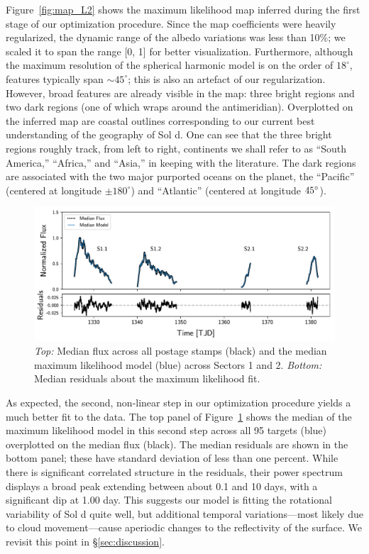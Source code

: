 \documentclass[modern]{aastex62}
\begin{document}
Figure~\ref{fig:map_L2} shows the maximum likelihood map inferred
during the first stage of our optimization procedure. Since the map
coefficients were heavily regularized, the dynamic range of the albedo
variations was less than 10\%; we scaled it to span the range [0, 1]
for better visualization. Furthermore, although the maximum resolution of
the spherical harmonic model is on 
the order of $18^\circ$, features typically span ${\sim}45^\circ$; this is
also an artefact of our regularization. However, broad features are already
visible in the map: three bright regions and two dark regions (one of which
wraps around the antimeridian). Overplotted on the inferred map are
coastal outlines corresponding to our current best understanding of 
the geography of Sol d. One can see that the three bright regions roughly
track, from left to right, continents we shall refer to as ``South America,''
``Africa,'' and ``Asia,'' in keeping with the literature. The dark regions
are associated with the two major purported oceans on the planet, the
``Pacific'' (centered at longitude $\pm180^\circ$) and ``Atlantic''
(centered at longitude $\-45^\circ$).

\begin{figure}[t!]
    \begin{centering}
    \includegraphics[width=\linewidth]{figures/model.pdf}
    \caption{\label{fig:model}
             \emph{Top:} Median flux across all postage stamps (black) and
             the median maximum likelihood model (blue) across Sectors 1 and 2.
             \emph{Bottom:} Median residuals about the maximum likelihood fit.
             }
    \end{centering}
\end{figure}

As expected, the second, non-linear step in our optimization procedure
yields a much better fit to the data.
The top panel of Figure~\ref{fig:model} shows the median of the 
maximum likelihood model in this second step
across all 95 targets (blue) overplotted on the median flux (black). 
The median residuals are shown in the bottom panel; these have
standard deviation of less than one percent. While there is significant correlated
structure in the residuals, their power spectrum displays a broad peak extending 
between about 0.1 and 10 days, with a significant dip at 1.00 day. This
suggests our model is fitting the rotational variability of Sol d quite well, but
additional temporal variations---most likely due to cloud movement---cause aperiodic
changes to the reflectivity of the surface. We revisit this point in \S\ref{sec:discussion}.
\end{document}
